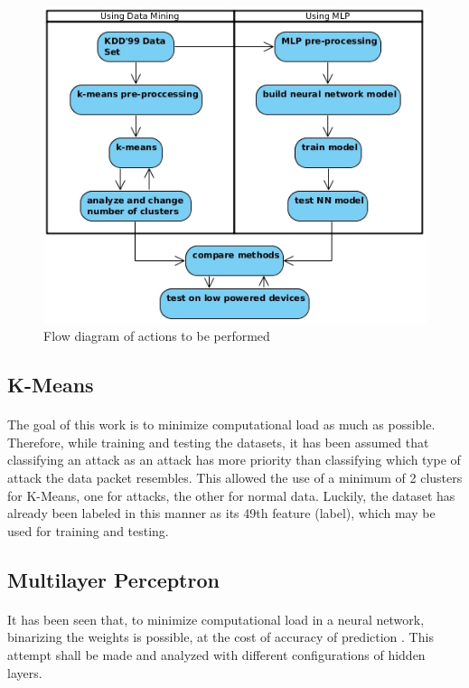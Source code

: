 \documentclass[a4paper,12pt]{article}
\begin{document}
        \begin{figure}
            \includegraphics{methodology}
            \caption{Flow diagram of actions to be performed}
        \end{figure}


        \subsection{K-Means}
        \paragraph{}
        The goal of this work is to minimize computational load as much as possible. Therefore, while training and testing the datasets, it has been assumed that classifying an attack as an attack has more priority than classifying which type of attack the data packet resembles. This allowed the use of a minimum of 2 clusters for K-Means, one for attacks, the other for normal data. Luckily, the dataset has already been labeled in this manner as its 49th feature (label), which may be used for training and testing.

        \subsection{Multilayer Perceptron}
        \paragraph{}
        It has been seen that, to minimize computational load in a neural network, binarizing the weights is possible, at the cost of accuracy of prediction \cite{mlp17}. This attempt shall be made and analyzed with different configurations of hidden layers.
\end{document}
